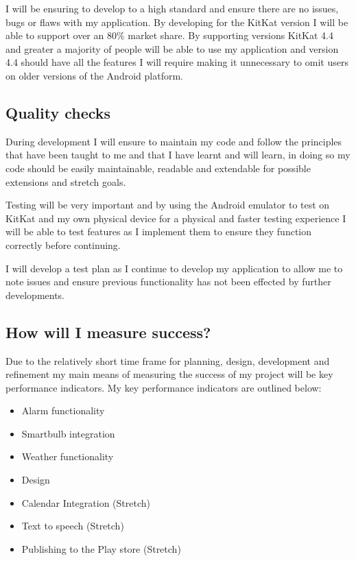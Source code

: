 I will be ensuring to develop to a high standard and ensure there are no
issues, bugs or flaws with my application. By developing for the KitKat
version I will be able to support over an 80\% market share.
\cite{androidversion} By supporting versions KitKat 4.4 and greater a
majority of people will be able to use my application and version 4.4
should have all the features I will require making it unnecessary to
omit users on older versions of the Android platform.

\subsection{Quality checks}\label{quality-checks}

During development I will ensure to maintain my code and follow the
principles that have been taught to me and that I have learnt and will
learn, in doing so my code should be easily maintainable, readable and
extendable for possible extensions and stretch goals.

Testing will be very important and by using the Android emulator to test
on KitKat and my own physical device for a physical and faster testing
experience I will be able to test features as I implement them to ensure
they function correctly before continuing.

I will develop a test plan as I continue to develop my application to
allow me to note issues and ensure previous functionality has not been
effected by further developments.

\subsection{How will I measure
success?}\label{how-will-i-measure-success}

Due to the relatively short time frame for planning, design, development
and refinement my main means of measuring the success of my project will
be key performance indicators. My key performance indicators are
outlined below:

\begin{itemize}
\tightlist
\item
  Alarm functionality
\item
  Smartbulb integration
\item
  Weather functionality
\item
  Design
\item
  Calendar Integration (Stretch)
\item
  Text to speech (Stretch)
\item
  Publishing to the Play store (Stretch)
\end{itemize}

